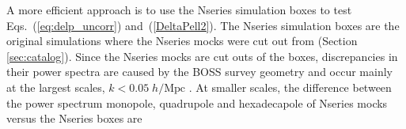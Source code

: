                                                                                                                                                                                                                                                                             A more efficient approach is to use the Nseries simulation boxes to test Eqs.~(\ref{eq:delp_uncorr}) and~(\ref{DeltaPell2}). The Nseries simulation boxes are the 
                                                                                                                                                                                                                                                                            original simulations where the Nseries mocks were 
                                                                                                                                                                                                                                                                            cut out from (Section \ref{sec:catalog}). Since the Nseries mocks 
                                                                                                                                                                                                                                                                            are cut outs of the boxes, 
                                                                                                                                                                                                                                                                            discrepancies in their power spectra are caused by the BOSS survey 
                                                                                                                                                                                                                                                                            geometry and occur mainly at the largest scales, $k < 0.05\;h/\mathrm{Mpc}$ \citep{Beutler:2014aa,Grieb:2016aa}. 
                                                                                                                                                                                                                                                                            At smaller scales, the difference between the power spectrum monopole, 
                                                                                                                                                                                                                                                                            quadrupole and hexadecapole of Nseries mocks versus the Nseries boxes are 
